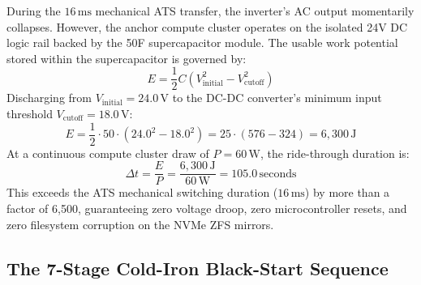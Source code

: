 During the $16\,\mathrm{ms}$ mechanical ATS transfer, the inverter's AC output momentarily collapses. However, the anchor compute cluster operates on the isolated 24V DC logic rail backed by the 50F supercapacitor module. The usable work potential stored within the supercapacitor is governed by:
\begin{equation}
E = \frac{1}{2} C \left( V_{\mathrm{initial}}^2 - V_{\mathrm{cutoff}}^2 \right)
\label{eq:supercap_energy}
\end{equation}
Discharging from $V_{\mathrm{initial}} = 24.0\,\mathrm{V}$ to the DC-DC converter's minimum input threshold $V_{\mathrm{cutoff}} = 18.0\,\mathrm{V}$:
\begin{equation}
E = \frac{1}{2} \cdot 50 \cdot \left( 24.0^2 - 18.0^2 \right) = 25 \cdot (576 - 324) = 6,300\,\mathrm{J}
\label{eq:supercap_joules}
\end{equation}
At a continuous compute cluster draw of $P = 60\,\mathrm{W}$, the ride-through duration is:
\begin{equation}
\Delta t = \frac{E}{P} = \frac{6,300\,\mathrm{J}}{60\,\mathrm{W}} = 105.0\,\mathrm{seconds}
\label{eq:supercap_time}
\end{equation}
This exceeds the ATS mechanical switching duration ($16\,\mathrm{ms}$) by more than a factor of 6,500, guaranteeing zero voltage droop, zero microcontroller resets, and zero filesystem corruption on the NVMe ZFS mirrors.

\subsection{The 7-Stage Cold-Iron Black-Start Sequence}


